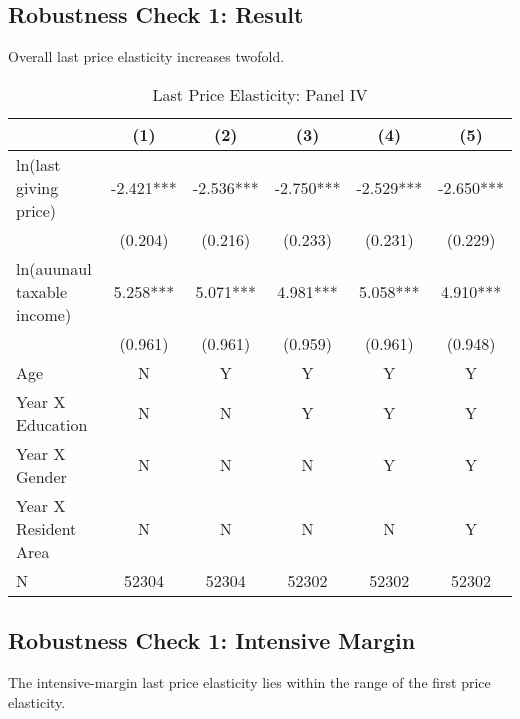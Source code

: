 \documentclass[ review  , 3p ]{elsarticle}
\begin{document}
  \hypertarget{robustness-check-1-result}{%
  \subsection{Robustness Check 1: Result}\label{robustness-check-1-result}}

  Overall last price elasticity increases twofold.

  \begin{table}

  \caption{\label{tab:kableLastElasticity1}Last Price Elasticity: Panel IV}
  \centering
  \fontsize{7}{9}\selectfont
  \begin{tabular}[t]{lccccc}
  \toprule
   & (1) & (2) & (3) & (4) & (5)\\
  \midrule
  ln(last giving price) & -2.421*** & -2.536*** & -2.750*** & -2.529*** & -2.650***\\
   & (0.204) & (0.216) & (0.233) & (0.231) & (0.229)\\
  ln(auunaul taxable income) & 5.258*** & 5.071*** & 4.981*** & 5.058*** & 4.910***\\
   & (0.961) & (0.961) & (0.959) & (0.961) & (0.948)\\
  Age & N & Y & Y & Y & Y\\
  Year X Education & N & N & Y & Y & Y\\
  Year X Gender & N & N & N & Y & Y\\
  Year X Resident Area & N & N & N & N & Y\\
  N & 52304 & 52304 & 52302 & 52302 & 52302\\
  \bottomrule
  \end{tabular}
  \end{table}

  \hypertarget{robustness-check-1-intensive-margin}{%
  \subsection{Robustness Check 1: Intensive Margin}\label{robustness-check-1-intensive-margin}}

  The intensive-margin last price elasticity lies within the range of the first price elasticity.
\end{document}
